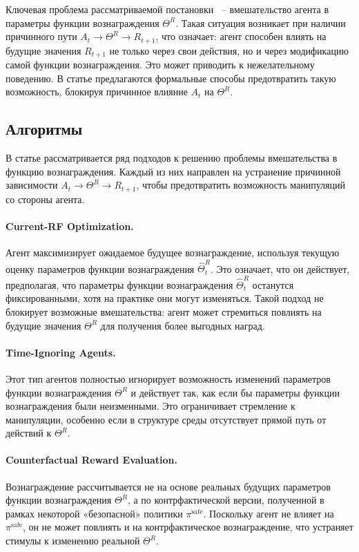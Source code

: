 Ключевая проблема рассматриваемой постановки ~-- вмешательство агента в параметры функции вознаграждения $\Theta^R$. Такая ситуация возникает при наличии причинного пути $A_t \to \Theta^R \to R_{t+1}$, что означает: агент способен влиять на будущие значения $R_{t+1}$ не только через свои действия, но и через модификацию самой функции вознаграждения. Это может приводить к нежелательному поведению. В статье предлагаются формальные способы предотвратить такую возможность, блокируя причинное влияние $A_t$ на $\Theta^R$.


\subsection{Алгоритмы}

В статье рассматривается ряд подходов к решению проблемы вмешательства в функцию вознаграждения. Каждый из них направлен на устранение причинной зависимости $A_t \to \Theta^R \to R_{t+1}$, чтобы предотвратить возможность манипуляций со стороны агента.

\paragraph{Current-RF Optimization.} Агент максимизирует ожидаемое будущее вознаграждение, используя текущую оценку параметров функции вознаграждения $\hat{\Theta}^R_t$. Это означает, что он действует, предполагая, что параметры функции вознаграждения $\hat{\Theta}^R_t$ останутся фиксированными, хотя на практике они могут изменяться. Такой подход не блокирует возможные вмешательства: агент может стремиться повлиять на будущие значения $\Theta^R$ для получения более выгодных наград.

\paragraph{Time-Ignoring Agents.} Этот тип агентов полностью игнорирует возможность изменений параметров функции вознаграждения $\Theta^R$ и действует так, как если бы параметры функции вознаграждения были неизменными. Это ограничивает стремление к манипуляции, особенно если в структуре среды отсутствует прямой путь от действий к $\Theta^R$.

\paragraph{Counterfactual Reward Evaluation.} Вознаграждение рассчитывается не на основе реальных будущих параметров функции вознаграждения $\Theta^R$, а по контрфактической версии, полученной в рамках некоторой «безопасной» политики $\pi^{\text{safe}}$. Поскольку агент не влияет на $\pi^{\text{safe}}$, он не может повлиять и на контрфактическое вознаграждение, что устраняет стимулы к изменению реальной $\Theta^R$.

